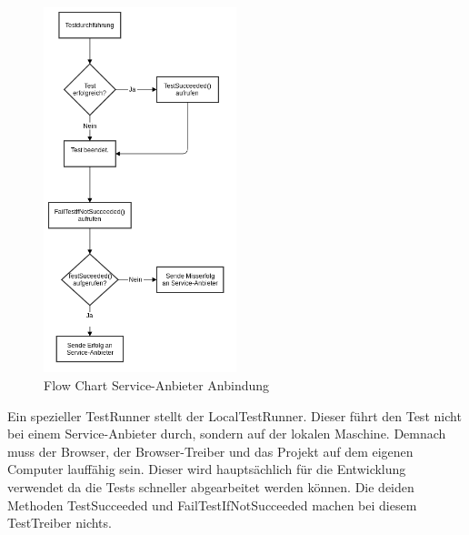 \begin{figure}[H]
	\centering
	\includegraphics[width=0.5\textwidth]{images/Semesteararbeit flow chart - service anbieter.png}
	\caption{Flow Chart Service-Anbieter Anbindung}
	\label{fig:umsetzung:architektur:testrunners:serviceanbieter}
\end{figure}

Ein spezieller TestRunner stellt der LocalTestRunner. Dieser führt den Test nicht bei einem Service-Anbieter durch, sondern auf der lokalen Maschine. Demnach muss der Browser, der Browser-Treiber und das Projekt auf dem eigenen Computer lauffähig sein. Dieser wird hauptsächlich für die Entwicklung verwendet da die Tests schneller abgearbeitet werden können. Die deiden Methoden TestSucceeded und FailTestIfNotSucceeded machen bei diesem TestTreiber nichts.

